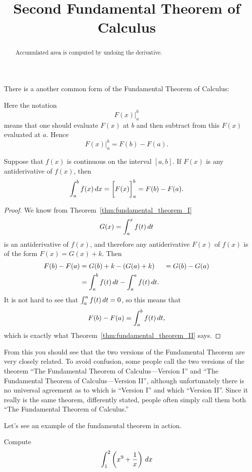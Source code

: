 \documentclass{ximera}
\title[Dig-In:]{Second Fundamental Theorem of Calculus}
\begin{document}
\begin{abstract}
Accumulated area is computed by undoing the derivative. 
\end{abstract}
\maketitle




There is a another common form of the Fundamental Theorem of Calculus:

Here the notation
\[
F(x) \Biggr|_a^b
\]
means that one should evaluate $F(x)$ at $b$ and then subtract from this $F(x)$ evaluated at $a$. Hence
\[
F(x) \Biggr|_a^b = F(b)-F(a).
\]  

\begin{theorem}
  Suppose that $f(x)$ is continuous on the interval $[a,b]$. If $F(x)$
  is any antiderivative of $f(x)$, then
  \[
  \int_a^b f(x)\,d x = \bigg[ F(x) \bigg]_a^b = F(b)-F(a).
  \]
\end{theorem}

\begin{proof}
We know from Theorem~\ref{thm:fundamental_theorem_I} 
\[
  G(x)=\int_a^x f(t)\,d t
\]
is an antiderivative of $f(x)$, and therefore any antiderivative
$F(x)$ of $f(x)$ is of the form $F(x)=G(x)+k$. Then 
\begin{align*}
  F(b)-F(a) &=G(b)+k-(G(a)+k) 
  &= G(b)-G(a) \\
  &=\int_a^b f(t)\,d t-\int_a^a f(t)\,d t.
\end{align*}
It is not hard to see that $\int_a^a f(t)\,d t=0$, so this means that
\[
  F(b)-F(a)=\int_a^b f(t)\,d t,
\]
which is exactly what Theorem~\ref{thm:fundamental_theorem_II} says.
\end{proof}

From this you should see that the two versions of the Fundamental
Theorem are very closely related. To avoid confusion, some people call
the two versions of the theorem ``The Fundamental Theorem of
Calculus---Version I'' and ``The Fundamental Theorem of
Calculus---Version II'', although unfortunately there is no universal
agreement as to which is ``Version I'' and which ``Version II''. Since
it really is the same theorem, differently stated, people often simply
call them both ``The Fundamental Theorem of Calculus.''

Let's see an example of the fundamental theorem in action.

\begin{example}
Compute
\[
\int_1^2\left(x^9 + \frac{1}{x}\right) \,d x
\]
\end{example}
\end{document}
